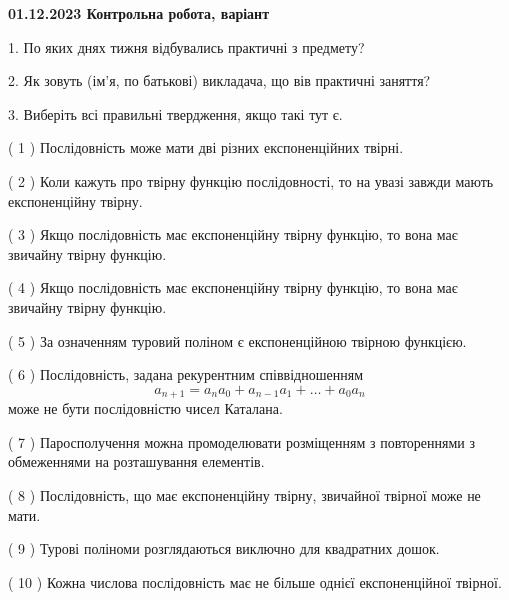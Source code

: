 \documentclass[12pt, ukrainian]{article}
\begin{document}
\vspace{4mm}
\newpage
\begin {large}

\textbf{01.12.2023 Контрольна робота, варіант  }\par


{
1. По яких днях тижня відбувались практичні з предмету?



\vspace{5mm}
2. Як зовуть (ім'я, по батькові) викладача, що вів практичні заняття?



\vspace{5mm}
3. Виберіть всі правильні твердження, якщо такі тут є.\par
\vspace{2mm}
( 1 ) Послідовність може мати дві різних експоненційних твірні.%

( 2 ) Коли кажуть про твірну функцію послідовності, то на увазі завжди мають експоненційну твірну.%

( 3 ) Якщо послідовність має експоненційну твірну функцію, то вона має звичайну твірну функцію.%

( 4 ) Якщо послідовність має експоненційну твірну функцію, то вона має звичайну твірну функцію.%

( 5 ) За означенням туровий поліном є експоненційною твірною функцією.%

( 6 ) Послідовність, задана рекурентним співвідношенням $$a_{n+1}=a_{n}a_{0}+a_{n-1}a_{1}+\ldots+a_0a_{n}$$ може не бути послідовністю чисел Каталана.%

( 7 ) Паросполучення можна промоделювати розміщенням з повтореннями з обмеженнями на розташування елементів.%

( 8 ) Послідовність, що має експоненційну твірну, звичайної твірної може не мати.%

( 9 ) Турові поліноми розглядаються виключно для квадратних дошок.%

( 10 ) Кожна числова послідовність має не більше однієї  експоненційної твірної.%
}
\end {large}
\end{document}
